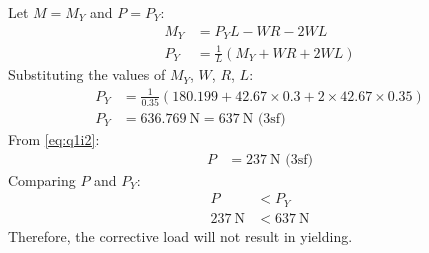 \documentclass[11pt]{article}
\numberwithin{equation}{section}
\begin{document}
Let $M = M_Y$ and $P = P_Y$:
\begin{align}
    M_Y &= P_Y L - WR - 2WL\\
    P_Y &= \frac{1}{L}\left(M_Y + WR + 2WL\right)
\end{align}
Substituting the values of $M_Y$, $W$, $R$, $L$:
\begin{align}
    P_Y &= \frac{1}{0.35}\left(180.199+ 42.67\times 0.3 + 2\times 42.67 \times 0.35\right)\\
    P_Y &= \SI{636.769}{\newton} = \SI{637}{\newton} \textrm{ (3sf)}
\end{align}
From \ref{eq:q1i2}:
\begin{align}
    P &= \SI{237}{\newton} \textrm{ (3sf)}
\end{align}
Comparing $P$ and $P_Y$:
\begin{align}
    P &< P_Y\\
    \SI{237}{\newton} &< \SI{637}{\newton}
\end{align}
Therefore, the corrective load will not result in yielding.
\end{document}
